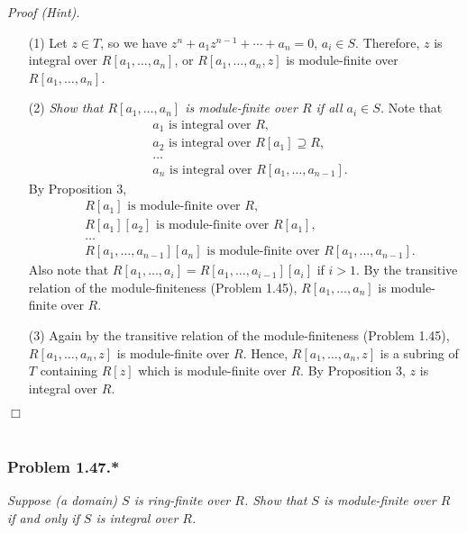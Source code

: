\documentclass{article}
\begin{document}
\emph{Proof (Hint).}
\begin{enumerate}
\item[(1)]
  Let $z \in T$, so we have
  $z^n + a_1 z^{n-1} + \cdots + a_n = 0$, $a_i \in S$.
  Therefore, $z$ is integral over $R[a_1, \ldots, a_n]$,
  or $R[a_1, \ldots, a_n, z]$ is module-finite over $R[a_1, \ldots, a_n]$.

\item[(2)]
  \emph{Show that $R[a_1, \ldots, a_n]$ is module-finite over $R$ if all $a_i \in S$.}
  Note that
  \begin{align*}
    & \text{$a_1$ is integral over $R$}, \\
    & \text{$a_2$ is integral over $R[a_1] \supseteq R$}, \\
    & \ldots \\
    & \text{$a_n$ is integral over $R[a_1,\ldots,a_{n-1}]$}.
  \end{align*}
  By Proposition 3,
  \begin{align*}
    & \text{$R[a_1]$ is module-finite over $R$}, \\
    & \text{$R[a_1][a_2]$ is module-finite over $R[a_1]$}, \\
    & \ldots \\
    & \text{$R[a_1,\ldots,a_{n-1}][a_n]$ is module-finite over $R[a_1,\ldots,a_{n-1}]$}.
  \end{align*}
  Also note that $R[a_1,\ldots,a_i] = R[a_1,\ldots,a_{i-1}][a_i]$ if $i > 1$.
  By the transitive relation of the module-finiteness (Problem 1.45),
  $R[a_1, \ldots, a_n]$ is module-finite over $R$.

\item[(3)]
  Again by the transitive relation of the module-finiteness (Problem 1.45),
  $R[a_1, \ldots, a_n, z]$ is module-finite over $R$.
  Hence, $R[a_1, \ldots, a_n, z]$ is a subring of $T$ containing $R[z]$
  which is module-finite over $R$.
  By Proposition 3, $z$ is integral over $R$.
\end{enumerate}
$\Box$ \\\\






\subsubsection*{Problem 1.47.*}
\emph{Suppose (a domain) $S$ is ring-finite over $R$.
Show that $S$ is module-finite over $R$ if and only if $S$ is integral over $R$.} \\
\end{document}
